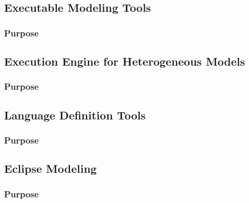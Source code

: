 \documentclass{gemoc} %
\begin{document}
\subsection{Executable Modeling Tools}


\subsubsection{Purpose}



\subsection{Execution Engine for Heterogeneous Models}


\subsubsection{Purpose}



\subsection{Language Definition Tools}


\subsubsection{Purpose}



\subsection{Eclipse Modeling}


\subsubsection{Purpose}
\end{document}
